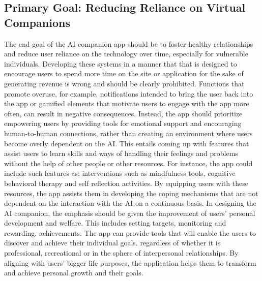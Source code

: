 \subsection{Primary Goal: Reducing Reliance on Virtual Companions}
The end goal of the AI companion app should be to foster healthy relationships and reduce user reliance on the technology over time, especially for vulnerable individuals.  Developing these systems in a manner that that is designed to encourage users to spend more time on the site or application for the sake of generating revenue is wrong and should be clearly prohibited. Functions that promote overuse, for example, notifications intended to bring the user back into the app or gamified elements that motivate users to engage with the app more often, can result in negative consequences. Instead, the app should prioritize empowering users by providing tools for emotional support and
encouraging human-to-human connections, rather than creating an environment where users become overly dependent on the AI. This entails coming up with features that assist users to learn skills and ways of handling their feelings and problems without the help of other people or other resources. For instance, the app could include such features as; interventions such as mindfulness tools, cognitive behavioral therapy and self reflection activities. By equipping users with these resources, the app assists them in developing the coping mechanisms that are not dependent on the interaction with the AI on a continuous basis. In designing the AI companion, the emphasis should be given the improvement of users' personal development and welfare. This includes setting targets, monitoring and rewarding. achievements. The app can provide tools that will enable the users to discover and achieve their individual goals. regardless of whether it is professional, recreational or in the sphere of interpersonal relationships. By aligning with users' bigger life purposes, the application helps them to transform and achieve personal growth and their goals.